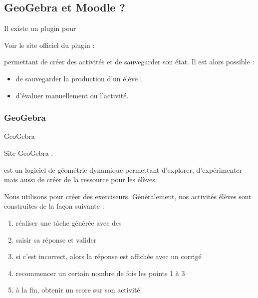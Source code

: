\documentclass[letterpaper,10pt,french]{sphinxmanual}
\begin{document}
\subsection{GeoGebra et Moodle ?}
\label{\detokenize{projet-description::doc}}\label{\detokenize{projet-description:geogebra-et-moodle}}
Il existe un plugin pour  %
\begin{footnote}[1]\sphinxAtStartFootnote
Voir le site officiel du plugin : 
%
\end{footnote} permettant de créer des activités
 et de sauvegarder son état. Il est alors possible :
\begin{itemize}
\item {} 
de sauvegarder la production d’un élève ;

\item {} 
d’évaluer manuellement ou  l’activité.

\end{itemize}


\subsubsection{GeoGebra}
\label{\detokenize{projet-description:geogebra}}
GeoGebra %
\begin{footnote}[2]\sphinxAtStartFootnote
Site GeoGebra : 
%
\end{footnote} est un logiciel de géométrie dynamique permettant d’explorer,
d’expérimenter mais aussi de créer de la ressource pour les élèves.

Nous utilisons  pour créer des exerciseurs. Généralement, nos activités
élèves sont construites de la façon suivante :
\begin{enumerate}
\item {} 
réaliser une tâche générée avec des 

\item {} 
saisir sa réponse et valider

\item {} 
si c’est incorrect, alors la réponse est affichée avec un corrigé

\item {} 
recommencer un certain nombre de fois les points 1 à 3

\item {} 
à la fin, obtenir un score sur son activité

\end{enumerate}
\end{document}
